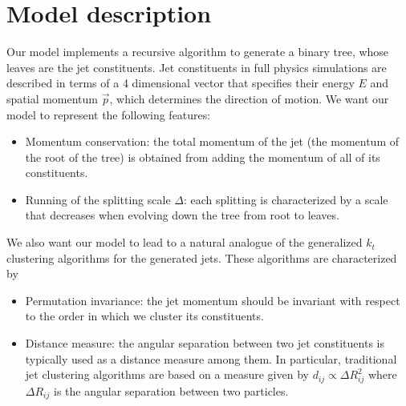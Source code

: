 \documentclass[12pt]{article}
\begin{document}
\vspace{0.6cm}
\section{Model description}

Our model implements a recursive algorithm to generate a binary tree, whose leaves are the jet constituents. Jet constituents in full physics simulations are described in terms of a 4 dimensional vector that specifies their energy $E$ and spatial momentum $\vec{p}$, which determines the direction of motion. 
We want our model to represent the following features:
\begin{itemize}
\item Momentum conservation: the total momentum of the jet (the momentum of the root of the tree) is obtained from adding the momentum of all of its constituents.

\item Running of the splitting scale $\Delta$: each splitting is characterized by a scale that decreases when evolving down the tree from root to leaves.





\end{itemize}

We also want our model to lead to a natural analogue of the generalized $k_t$ clustering algorithms for the generated jets. These algorithms are characterized by

\begin{itemize}
\item Permutation invariance: the jet momentum should be invariant with respect to the order in which we cluster its constituents.

\item Distance measure: the angular separation between two jet constituents is typically used as a distance measure among them. In particular, traditional jet clustering algorithms are based on a measure given by 
$d_{ij} \propto  \Delta R_{ij}^2$
where $\Delta R_{ij}$ is the angular separation between two particles.

\end{itemize} 
\end{document}
